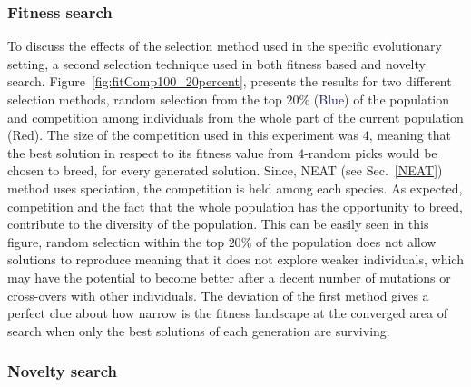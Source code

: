 \subsubsection*{Fitness search}

To discuss the effects of the selection method used in the specific evolutionary setting, a second selection technique used in both fitness based and novelty search. Figure~\ref{fig:fitComp100_20percent}, presents the results for two different selection methods, random selection from the top $20\%$ (\textcolor{MidnightBlue}{Blue}) of the population and competition among individuals from the whole part of the current population (\textcolor{BrickRed}{Red}). The size of the competition used in this experiment was $4$, meaning that the best solution in respect to its fitness value from $4$-random picks would be chosen to breed, for every generated solution. Since, NEAT (see Sec.~\ref{NEAT}) method uses speciation, the competition is held among each species. As expected, competition and the fact that the whole population has the opportunity to breed, contribute to the diversity of the population. This can be easily seen in this figure, random selection within the top $20\%$ of the population does not allow solutions to reproduce meaning that it does not explore weaker individuals, which may have the potential to become better after a decent number of mutations or cross-overs with other individuals. The deviation of the first method gives a perfect clue about how narrow is the fitness landscape at the converged area of search when only the best solutions of each generation are surviving.

\subsubsection*{Novelty search}

